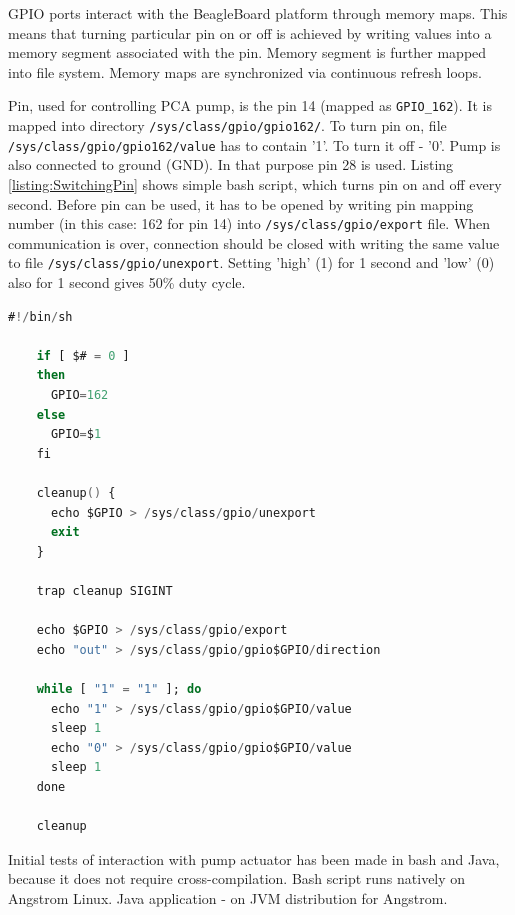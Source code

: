 GPIO ports interact with the BeagleBoard platform through memory maps. This means that turning particular pin on or off is achieved by writing values into a memory segment associated with the pin. Memory segment is further mapped into file system. Memory maps are synchronized via continuous refresh loops.

Pin, used for controlling PCA pump, is the pin 14 (mapped as \lstinline{GPIO_162}). It is mapped into directory \lstinline{/sys/class/gpio/gpio162/}. To turn pin on, file \lstinline{/sys/class/gpio/gpio162/value} has to contain '1'. To turn it off - '0'. Pump is also connected to ground (GND). In that purpose pin 28 is used. Listing \ref{listing:SwitchingPin} shows simple bash script, which turns pin on and off every second. Before pin can be used, it has to be opened by writing pin mapping number (in this case: 162 for pin 14) into \lstinline{/sys/class/gpio/export} file. When communication is over, connection should be closed with writing the same value to file \lstinline{/sys/class/gpio/unexport}. Setting 'high' (1) for 1 second and 'low' (0) also for 1 second gives 50\% duty cycle.

\begin{lstlisting}[language=ada, frame=single, gobble=0, caption={Turning pin on and off}]
	#!/bin/sh

	if [ $# = 0 ]
	then
	  GPIO=162
	else
	  GPIO=$1
	fi

	cleanup() {
	  echo $GPIO > /sys/class/gpio/unexport
	  exit
	}

	trap cleanup SIGINT

	echo $GPIO > /sys/class/gpio/export
	echo "out" > /sys/class/gpio/gpio$GPIO/direction

	while [ "1" = "1" ]; do
	  echo "1" > /sys/class/gpio/gpio$GPIO/value
	  sleep 1
	  echo "0" > /sys/class/gpio/gpio$GPIO/value
	  sleep 1
	done

	cleanup

\end{lstlisting} 
\label{listing:SwitchingPin}

Initial tests of interaction with pump actuator has been made in bash and Java, because it does not require cross-compilation. Bash script runs natively on Angstrom Linux. Java application - on JVM distribution for Angstrom. 

